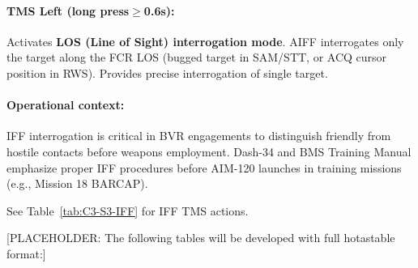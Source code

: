 \documentclass[11pt, a4paper, twoside]{report}
\newenvironment{hotastable}[1]{%
	\small
	\setlength{\tabcolsep}{2pt}
	\renewcommand{\arraystretch}{1.25}
	\begin{longtable}{L{1.00cm} L{0.90cm} L{0.90cm} L{3.30cm} L{6.40cm} L{1.40cm} L{2.10cm}}
		\caption{#1}\\
		\rowcolor{headerblue}
		\multicolumn{1}{>{\centering\arraybackslash}p{1.00cm}}{\textbf{\color{white}Mode}} &
		\multicolumn{1}{>{\centering\arraybackslash}p{0.90cm}}{\textbf{\color{white}Dir.}} &
		\multicolumn{1}{>{\centering\arraybackslash}p{0.90cm}}{\textbf{\color{white}Act.}} &
		\multicolumn{1}{>{\centering\arraybackslash}p{3.30cm}}{\textbf{\color{white}Function}} &
		\multicolumn{1}{>{\centering\arraybackslash}p{6.40cm}}{\textbf{\color{white}Effect / Nuance}} &
		\multicolumn{1}{>{\centering\arraybackslash}p{1.40cm}}{\textbf{\color{white}Dash34}} &
		\multicolumn{1}{>{\centering\arraybackslash}p{2.10cm}}{\textbf{\color{white}Train.}} \\
		\endfirsthead
		\rowcolor{headerblue}
		\multicolumn{1}{>{\centering\arraybackslash}p{1.00cm}}{\textbf{\color{white}Mode}} &
		\multicolumn{1}{>{\centering\arraybackslash}p{0.90cm}}{\textbf{\color{white}Dir.}} &
		\multicolumn{1}{>{\centering\arraybackslash}p{0.90cm}}{\textbf{\color{white}Act.}} &
		\multicolumn{1}{>{\centering\arraybackslash}p{3.30cm}}{\textbf{\color{white}Function}} &
		\multicolumn{1}{>{\centering\arraybackslash}p{6.40cm}}{\textbf{\color{white}Effect / Nuance}} &
		\multicolumn{1}{>{\centering\arraybackslash}p{1.40cm}}{\textbf{\color{white}Dash34}} &
		\multicolumn{1}{>{\centering\arraybackslash}p{2.10cm}}{\textbf{\color{white}Train.}} \\
		\endhead
		\multicolumn{7}{r}{\small\emph{Continued on next page}}\\
		\endfoot
		\endlastfoot
	}{%
	\end{longtable}
}
\begin{document}
\paragraph{TMS Left (long press$\geq$0.6s):}
Activates \textbf{LOS (Line of Sight) interrogation mode}. AIFF interrogates only the target along the FCR LOS (bugged target in SAM/STT, or ACQ cursor position in RWS). Provides precise interrogation of single target.

\paragraph{Operational context:}
IFF interrogation is critical in BVR engagements to distinguish friendly from hostile contacts before weapons employment. Dash-34 and BMS Training Manual emphasize proper IFF procedures before AIM-120 launches in training missions (e.g., Mission 18 BARCAP).

See Table~\ref{tab:C3-S3-IFF} for IFF TMS actions.


[PLACEHOLDER: The following tables will be developed with full hotastable format:]


\end{document}
